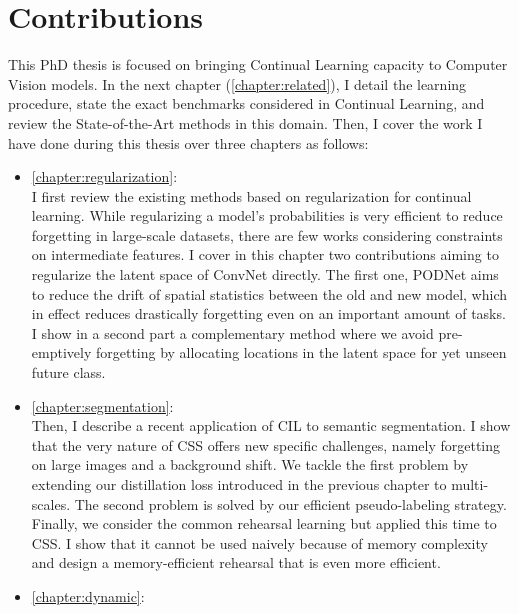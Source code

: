 \section{Contributions}

This PhD thesis is focused on bringing Continual Learning capacity to
Computer Vision models. In the next chapter (\autoref{chapter:related}), I detail the learning
procedure, state the exact benchmarks considered in Continual Learning, and review the
State-of-the-Art methods in this domain. Then, I cover the work I have done during this thesis over
three chapters as follows:

\begin{itemize}
      \item \autoref{chapter:regularization}: \\
            I first review the existing methods based on regularization for continual learning. While
            regularizing a model's probabilities is very efficient to reduce forgetting in large-scale
            datasets, there are few works considering constraints on intermediate features. I cover in this
            chapter two contributions aiming to regularize the latent space of \acs{ConvNet} directly. The
            first one, \acf{PODNet} aims to reduce the drift of spatial statistics between the old and new
            model, which in effect reduces drastically forgetting even on an important amount of tasks. I show in a
            second part a complementary method where we avoid pre-emptively forgetting by allocating
            locations in the latent space for yet unseen future class.
      \item \autoref{chapter:segmentation}: \\
            Then, I describe a recent application of \acf{CIL} to semantic segmentation. I show that
            the very nature of \acf{CSS} offers new specific challenges, namely forgetting on large
            images and a background shift. We tackle the first problem by extending our distillation
            loss introduced in the previous chapter to multi-scales. The second problem is solved by
            our efficient pseudo-labeling strategy. Finally, we consider the common rehearsal learning
            but applied this time to \ac{CSS}. I show that it cannot be used naively because of memory
            complexity and design a memory-efficient rehearsal that is even more efficient.
      \item \autoref{chapter:dynamic}: \\

\end{itemize}
